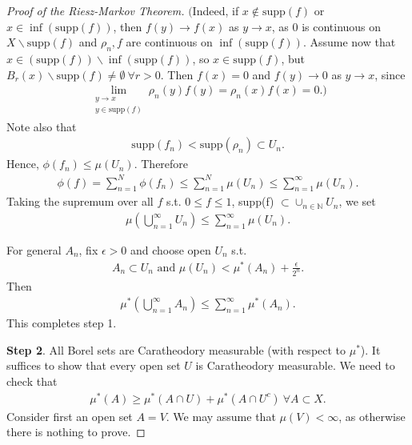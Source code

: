 \begin{proof}[Proof of the Riesz-Markov Theorem]
    \(\Big(\)Indeed, if \(x\notin \text{supp}(f)\) or \(x\in\inf(\text{supp}(f))\), then \(f(y)\rightarrow f(x)\) as \(y\rightarrow x\), as 0 is continuous on \(X\backslash\text{supp}(f)\) and \(\rho_n,f\) are continuous on \(\inf(\text{supp}(f))\). Assume now that \(x\in(\text{supp}(f))\backslash\inf(\text{supp}(f))\), so \(x\in\text{supp}(f)\), but \(B_r(x)\backslash\text{supp}(f)\neq\emptyset \ \forall r>0\). Then \(f(x) = 0\) and \(f(y)\rightarrow 0 \) as \(y\rightarrow x\), since
    \begin{align*}
        \lim_{\substack{y\rightarrow x \\ y\in\text{supp}(f)}} \rho_n(y)f(y) = \rho_n(x)f(x) = 0. \Big)
    \end{align*}
    Note also that 
    \begin{align*}
        \text{supp}(f_n) < \text{supp}(\rho_n) \subset U_n.
    \end{align*}
    Hence, \(\phi(f_n)\leq \mu(U_n)\). Therefore
    \begin{align*}
        \phi(f) = \sum\limits_{n=1}^{N}\phi(f_n) \leq \sum\limits_{n=1}^{N}\mu(U_n) \leq\sum\limits_{n=1}^{\infty} \mu(U_n).
    \end{align*}
    Taking the supremum over all \(f\)  s.t. \(0\leq f\leq 1\), supp(f) \(\subset \cup_{n\in\mathbb{N}}U_n\), we set
    \begin{align*}
        \mu\left(\bigcup\limits_{n=1}^{\infty}U_n\right) \leq \sum\limits_{n=1}^{\infty}\mu(U_n).
    \end{align*}
    
    For general \(A_n\), fix \(\epsilon>0\) and choose open \(U_n\) s.t. 
    \begin{align*}
        A_n\subset U_n \text{ and } \mu(U_n)<\mu^*(A_n) + \frac{\epsilon}{2^n}.
    \end{align*}
    Then
    \begin{align*}
        \mu^*\left(\bigcup\limits_{n=1}^{\infty}A_n\right) \leq \sum\limits_{n=1}^{\infty}\mu^*(A_n).
    \end{align*}
    This completes step 1.

    \textbf{Step 2}. All Borel sets are Caratheodory measurable (with respect to \(\mu^*\)). It suffices to show that every open set \(U\) is Caratheodory measurable. We need to check that 
    \begin{align*}
        \mu^*(A) \geq \mu^*\left(A\cap U\right) + \mu^*\left(A\cap U^c\right) \ \forall A\subset X.
    \end{align*}
    Consider first an open set \(A=V\). We may assume that \(\mu(V)<\infty\), as otherwise there is nothing to prove. 


\end{proof}

